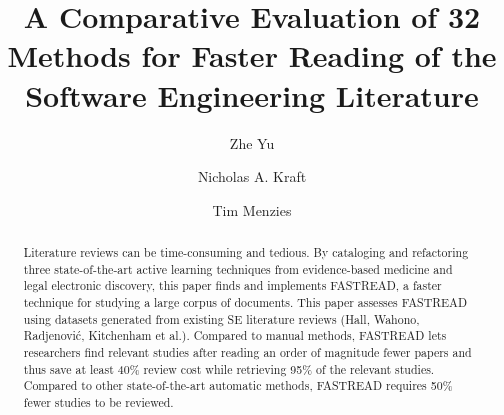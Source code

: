 \documentclass{svjour3}
\theoremstyle{break}
\begin{document}
\title{A Comparative Evaluation of 32 Methods for Faster Reading of the Software Engineering Literature%
}



\author{Zhe Yu         \and
        Nicholas A. Kraft \and 
        Tim Menzies%
}




\maketitle

\begin{abstract}
  
Literature reviews can be time-consuming and tedious.
By cataloging and refactoring three state-of-the-art active learning techniques from evidence-based medicine and legal electronic discovery, this paper finds and implements FASTREAD, a  faster technique for  studying a large corpus of documents. This paper assesses FASTREAD using   datasets generated from existing SE literature reviews (Hall, Wahono, Radjenovi{\'c}, Kitchenham et al.).
Compared to manual methods, FASTREAD lets 
researchers find relevant studies after reading an order of magnitude fewer papers and thus save at least 40\% review cost while retrieving 95\% of the relevant studies. Compared to  other state-of-the-art automatic methods,  FASTREAD requires 50\% fewer studies to be reviewed.


\end{abstract}
\end{document}
